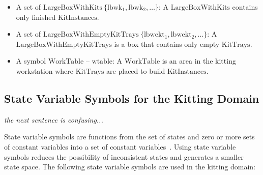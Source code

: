 \begin{small}
\begin{itemize}
\item A set of $\mathrm{LargeBoxWithKits\ \lbrace lbwk_1, lbwk_2,\dots \rbrace}$: A $\mathrm{LargeBoxWithKits}$ contains only finished $\mathrm{KitInstances}$.

\item A set of $\mathrm{LargeBoxWithEmptyKitTrays\ \lbrace lbwekt_1, lbwekt_2,\dots \rbrace}$: A $\mathrm{LargeBoxWithEmptyKitTrays}$ is a box that contains only empty $\mathrm{KitTrays}$.

\item A symbol $\mathrm{WorkTable}$ -- $\mathrm{wtable}$: A $\mathrm{WorkTable}$ is an area in the kitting workstation where $\mathrm{KitTrays}$ are placed to build $\mathrm{KitInstances}$.
\end{itemize}
\end {small}
\subsection{State Variable Symbols for the Kitting Domain}
{\it the next sentence is confusing...}

State variable symbols are functions from the set of states and zero or more sets of constant variables into a set of constant variables~\cite{NAU.2004}. Using state variable symbols reduces the possibility of inconsistent states and generates a smaller state space. The following state variable symbols are used in the kitting domain:

